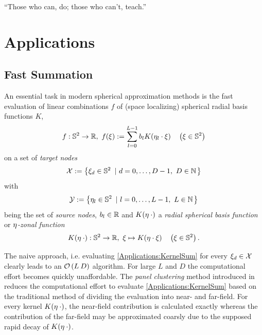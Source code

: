 \begin{savequote}[8cm]
  ``Those who can, do; those who can't, teach.''
\end{savequote}
\makeatletter
\chapter{Applications}
\label{Applications}

\section{Fast Summation}
\label{Applications:FastSum}

An essential task in modern spherical approximation methods is the fast evaluation of linear combinations $f$ of (space localizing) spherical radial basis functions $K$,  
\begin{equation}
  \label{Applications:KernelSum}
  f: \mathbb{S}^2 \rightarrow \mathbb{R},\ f{\hspace{-0.4ex}}\left(\xi\right) := \sum_{l = 0}^{L-1} 
    b_{l} K{\hspace{-0.4ex}}\left(\mathbf{\eta}_{l} \cdot \mathbf{\xi}\right) \quad \left(\mathbf{\xi} \in \mathbb{S}^2\right)
\end{equation}
on a set of \emph{target nodes} 
$$
  \mathcal{X} := \left\{\mathbf{\xi}_{d} \in \mathbb{S}^2\ \left|\ d=0,\ldots,D-1,\ D \in \mathbb{N}\right.\right\rbrace
$$ 
with 
$$
  \mathcal{Y} := \left\{\mathbf{\eta}_{l} \in \mathbb{S}^2\ \left|\ l = 0,\ldots,L-1,\ L \in \mathbb{N}\right.\right\rbrace
$$
being the set of \emph{source nodes}, $b_{l} \in \mathbb{R}$ and $K{\hspace{-0.4ex}}\left(\mathbf{\eta} \: \cdot\right)$ a \emph{radial spherical basis function} or \emph{$\mathbf{\eta}$-zonal function} 
\[
  K{\hspace{-0.4ex}}\left(\mathbf{\eta} \: \cdot\right): \mathbb{S}^2 \rightarrow \mathbb{R},\ \mathbf{\xi} \mapsto K{\hspace{-0.4ex}}\left(\mathbf{\eta} \cdot \mathbf{\xi}\right) \quad \left(\mathbf{\xi} \in \mathbb{S}^2\right).\]

The naive approach, i.e. evaluating \eqref{Applications:KernelSum} for every $\mathbf{\xi}_{d} \in \mathcal{X}$ clearly leads to an $\mathcal{O}\left(L\:D\right)$ algorithm. For large $L$ and $D$ the computational effort becomes quickly unaffordable.
The \emph{panel clustering} method introduced in \cite{FrGlSch98} reduces the computational effort to evaluate \eqref{Applications:KernelSum} based on the traditional method of dividing the evaluation into near- and far-field. For every kernel $K{\hspace{-0.4ex}}\left(\mathbf{\eta} \: \cdot\right)$, the near-field contribution is calculated exactly whereas the contribution of the far-field may be approximated coarsly due to the supposed rapid decay of $K{\hspace{-0.4ex}}\left(\mathbf{\eta} \: \cdot\right)$. 

